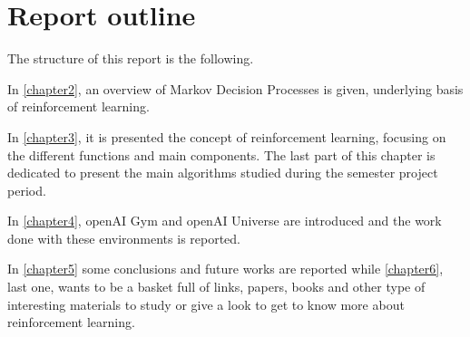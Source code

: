 \section{Report outline}
The structure of this report is the following.

In \autoref{chapter2}, an overview of Markov Decision Processes is given, underlying basis of reinforcement learning. 

In \autoref{chapter3}, it is presented the concept of reinforcement learning, focusing on the different functions and main components. The last part of this chapter is dedicated to present the main algorithms studied during the semester project period.

In \autoref{chapter4}, openAI Gym and openAI Universe are introduced and the work done with these environments is reported.

In \autoref{chapter5} some conclusions and future works are reported while \autoref{chapter6}, last one, wants to be a basket full of links, papers, books and other type of interesting materials to study or give a look to get to know more about reinforcement learning.